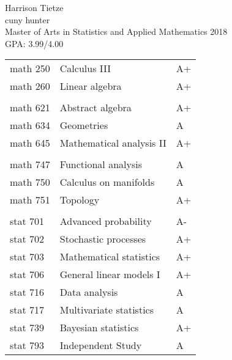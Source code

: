 \documentclass[12pt]{extreport}
\begin{document}
 \bfseries{\scshape 
\begin{center}
Harrison Tietze\\ \smallskip 
cuny hunter \\
Master of Arts in Statistics and Applied Mathematics 2018\\
GPA: 3.99/4.00
\end{center}
\begin{flushleft}

\begin{tabular}{ |p{2cm}|p{8cm}|p{5cm}  }
 math 250& Calculus III & A+ \\ 
 math 260 & Linear algebra & A+ \\
 \\  
 math 621 & Abstract algebra & A+\\
 math 634 & Geometries & A\\
 math 645 & Mathematical analysis II & A+\\
 \\
 math 747 & Functional analysis & A\\
 math 750 & Calculus on manifolds & A\\
 math 751 & Topology & A+\\
 \\
 stat 701& Advanced probability & A-\\
 stat 702 & Stochastic processes & A+\\   
 stat 703 & Mathematical statistics & A+\\
 stat 706 & General linear models I& A+\\
 stat 716 & Data analysis & A\\
 stat 717& Multivariate statistics & A\\
 stat 739& Bayesian statistics & A+\\
 stat 793& Independent Study & A
\end{tabular}
\end{flushleft}
}
\end{document}
